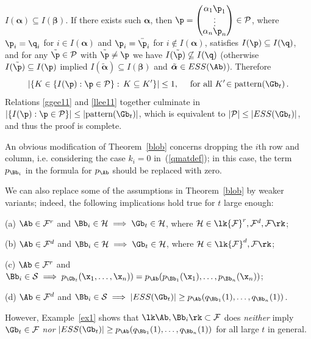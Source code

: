 \documentclass[moor]{informs3}              %
\def\reff#1{(\ref{#1})}
\begin{document}
$I(\bm{\alpha})\subseteq I(\bm{\beta})$. If there exists such $\bm{\alpha}$, then
$\renewcommand*{\arraystretch}{.5}
\p=\begin{pmatrix}
\alpha_1\p_1 \\
\vdots \\
\alpha_n\p_n
\end{pmatrix}
\in \mathcal{P}$, where $\p_i=\q_i$ for $i\in I(\bm{\alpha})$ and $\p_i=\bar\p_i$ for $i\not\in I(\bm{\alpha})$,
satisfies $I(\p)\subseteq I(\q)$, and for any $\tilde\p\in\mathcal{P}$ with $\tilde\p\ne\p$ we have $I(\tilde\p)\not\subseteq I(\q)$ (otherwise $I(\tilde \p)\subseteq I(\p)$ implied
$I(\tilde{\bm{\alpha}})\subseteq  I(\bm{\beta}) $ and $\tilde{\bm{\alpha}}\in ESS(\Ab)$). Therefore
\begin{equation}\label{llee11}
|\{K\in\{I(\p):\p\in\mathcal{P}\}:\,K\subseteq K'\}|\le1,\quad \textup{ for all }K'\!\in\textup{pattern}(\Gb_t)\, .
\end{equation}
Relations \eqref{ggee11} and \eqref{llee11} together culminate in $|\{I(\p):\p\in\mathcal{P}\}|\le|\textup{pattern}(\Gb_t)|$, which is equivalent to $|\mathcal{P}|\le|ESS(\Gb_t)|$, and thus the proof is complete.
\ep

An obvious modification of Theorem~\ref{blob} concerns dropping the $i$th row and column, i.e. considering the case $k_i=0$ in~\reff{qmatdef}; in this case, the term $p_{\Bb_i}$ in the formula for $p_{\Ab}$ should be replaced with zero.

We can also replace some of the assumptions in Theorem~\ref{blob} by weaker variants; indeed, the following implications hold true for $t$ large enough:

\noindent
(a) $\Ab\in {\mathcal F}^r$ and $\Bb_i\in {\mathcal H}\;\Longrightarrow \;\Gb_t\in {\mathcal H}$, where ${\mathcal H}\in \lk {\mathcal F}^r,{\mathcal F}^d,{\mathcal F}\rk$;

\noindent
(b) $\Ab\in {\mathcal F}^d$ and $\Bb_i\in {\mathcal H}\;\Longrightarrow \; \Gb_t\in {\mathcal H}$, where ${\mathcal H}\in \lk  {\mathcal F}^d,{\mathcal F}\rk$;

\noindent
(c) $\Ab\in {\mathcal F}^r$ and $\Bb_i\in {\mathcal S}\;\Longrightarrow \; p_{\Gb_t} (\x_1, \ldots , \x_n)) = p_{\Ab} ( p_{\Bb_1}(\x_1), \ldots,  p_{\Bb_n}(\x_n))$;

\noindent
(d) $\Ab\in {\mathcal F}^d$ and $\Bb_i\in {\mathcal S}\;\Longrightarrow \; |ESS({\Gb_t})|\ge p_{\Ab} (q_{\Bb_1}(1), \ldots,  q_{\Bb_n}(1))$.

However, Example~\ref{ex1} shows that $\lk \Ab,\Bb_i\rk\subset{\mathcal F}$ does {\em neither} imply $\Gb_t\in {\mathcal F}$ {\em nor} $|ESS({\Gb_t})|\ge p_{\Ab} (q_{\Bb_1}(1), \ldots,  q_{\Bb_n}(1))$ for all large $t$ in general.
\end{document}
